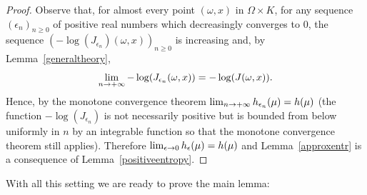 \documentclass[AHL,Unicode,longabstracts,published]{cedram}
\renewcommand*{\to}{\mathchoice{\longrightarrow}{\rightarrow}{\rightarrow}{\rightarrow}}
\begin{document}
\begin{proof}
Observe that, for almost every point $(\omega,x)$ in $\Omega \times K$, for any sequence $(\epsilon_{n})_{n \geq 0}$ of positive real numbers which decreasingly converges to $0$, the sequence $(-\log(J_{\epsilon_{n}})(\omega,x))_{n \geq 0}$ is increasing and, by Lemma~\ref{generaltheory},
\[
\lim_{n \to + \infty} -\log(J_{\epsilon_{n}}(\omega,x))=- \log(J(\omega,x)).
\]
Hence, by the monotone convergence theorem $\lim_{n \to + \infty} h_{\epsilon_{n}}(\mu)=h(\mu)$ (the function $-\log(J_{\epsilon_{n}})$ is not necessarily positive but is bounded from below uniformly in $n$ by an integrable function so that the monotone convergence theorem still applies). Therefore $\lim_{\epsilon \to 0} h_{\epsilon}(\mu)=h(\mu)$ and Lemma~\ref{approxentr} is a consequence of Lemma~\ref{positiveentropy}.
\end{proof}

With all this setting we are ready to prove the main lemma:
\end{document}
